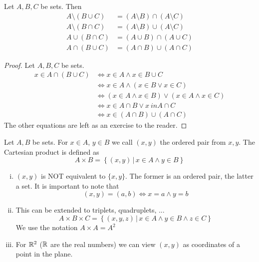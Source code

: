 \documentclass[../../script.tex]{subfiles}
\begin{document}
\begin{thm}
	Let $A, B, C$ be sets. Then
	\begin{align*}
		A \setminus (B \cup C) &= (A \setminus B) \cap (A \setminus C) \\
		A \setminus (B \cap C) &= (A \setminus B) \cup (A \setminus C) \\
		A \cup (B \cap C) &= (A \cup B) \cap (A \cup C) \\
		A \cap (B \cup C) &= (A \cap B) \cup (A \cap C)
	\end{align*}
\end{thm}
\begin{proof}
	Let $A, B, C$ be sets. 
	\begin{equation}
	\begin{split}
		x \in A \cap (B \cup C) &\iff x \in A \wedge x \in B \cup C \\
		&\iff x \in A \wedge (x \in B \vee x \in C) \\
		&\iff (x \in A \wedge x \in B) \vee (x \in A \wedge x \in C) \\
		&\iff x \in A \cap B \vee x\ in A \cap C \\
		&\iff x \in (A \cap B) \cup (A \cap C)
	\end{split}
	\end{equation}
	The other equations are left as an exercise to the reader.
\end{proof}

\begin{defi}
	Let $A, B$ be sets. For $x \in A$, $y \in B$ we call $(x, y)$ the ordered pair from $x, y$. The Cartesian product is defined as
	\[
		A \times B = \left\{(x, y) \,\vert\, x \in A \wedge y \in B\right\}
	\]
\end{defi}

\begin{rem}\leavevmode
\begin{enumerate}[(i)]
	\item $(x, y)$ is NOT equivalent to $\{x, y\}$. The former is an ordered pair, the latter a set. It is important to note that
	\[
		(x, y) = (a, b) \iff x = a \wedge y = b
	\]
	\item This can be extended to triplets, quadruplets, ...
	\[
		A \times B \times C = \left\{(x, y, z) \,\vert\, x \in A \wedge y \in B \wedge z \in C \right\}
	\]
	We use the notation $A \times A = A^2$
	\item For $\mathbb{R}^2$ ($\mathbb{R}$ are the real numbers) we can view $(x, y)$ as coordinates of a point in the plane.
\end{enumerate}
\end{rem}
\end{document}

